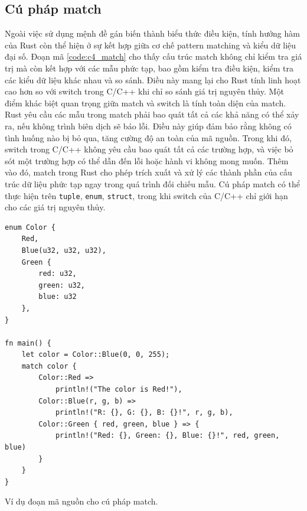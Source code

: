 \subsection{Cú pháp match}

Ngoài việc sử dụng mệnh đề gán biến thành biểu thức điều kiện, tính hướng hàm của Rust còn thể hiện ở sự kết hợp giữa cơ chế pattern matching và kiểu dữ liệu đại số.
Đoạn mã \ref{code:c4_match} cho thấy cấu trúc match không chỉ kiểm tra giá trị mà còn kết hợp với các mẫu phức tạp, bao gồm kiểm tra điều kiện, kiểm tra các kiểu dữ liệu khác nhau và so sánh.
Điều này mang lại cho Rust tính linh hoạt cao hơn so với switch trong C/C++ khi chỉ so sánh giá trị nguyên thủy.
Một điểm khác biệt quan trọng giữa match và switch là tính toàn diện của match.
Rust yêu cầu các mẫu trong match phải bao quát tất cả các khả năng có thể xảy ra, nếu không trình biên dịch sẽ báo lỗi.
Điều này giúp đảm bảo rằng không có tình huống nào bị bỏ qua, tăng cường độ an toàn của mã nguồn.
Trong khi đó, switch trong C/C++ không yêu cầu bao quát tất cả các trường hợp, và việc bỏ sót một trường hợp có thể dẫn đến lỗi hoặc hành vi không mong muốn.
Thêm vào đó, match trong Rust cho phép trích xuất và xử lý các thành phần của cấu trúc dữ liệu phức tạp ngay trong quá trình đối chiếu mẫu.
Cú pháp match có thể thực hiện trên \texttt{tuple}, \texttt{enum}, \texttt{struct}, trong khi switch của C/C++ chỉ giới hạn cho các giá trị nguyên thủy.

\begin{listing}[H]
\begin{verbatim}
enum Color {
    Red,
    Blue(u32, u32, u32),
    Green {
        red: u32,
        green: u32,
        blue: u32
    },
}

fn main() {
    let color = Color::Blue(0, 0, 255);
    match color {
        Color::Red =>
            println!("The color is Red!"),
        Color::Blue(r, g, b) =>
            println!("R: {}, G: {}, B: {}!", r, g, b),
        Color::Green { red, green, blue } => {
            println!("Red: {}, Green: {}, Blue: {}!", red, green, blue)
        }
    }
}
\end{verbatim}
\caption{Ví dụ đoạn mã nguồn cho cú pháp match.}
\label{code:c4_match}
\end{listing}

